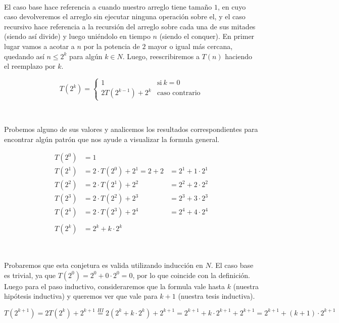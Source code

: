 ~

El caso base hace referencia a cuando nuestro arreglo tiene tama\~no $1$, en cuyo caso devolveremos el arreglo sin ejecutar ninguna operaci\'on sobre el, y el caso recursivo hace referencia a la recursi\'on del arreglo sobre cada una de sus mitades (siendo as\'i divide) y luego uni\'endolo en tiempo $n$ (siendo el conquer). En primer lugar vamos a acotar a $n$ por la potencia de $2$ mayor o igual m\'as cercana, quedando as\'i $n \leq 2^k$ para alg\'un $k \in N$. Luego, reescribiremos a $T(n)$ haciendo el reemplazo por $k$.

\begin{equation*}
  T(2^k) = \begin{cases}
	      1         		& \text{si} \ k = 0 \\
	      2T(2^{k-1}) + 2^k        	& \text{caso contrario}
	  \end{cases}
\end{equation*}

~

Probemos alguno de sus valores y analicemos los resultados correspondientes para encontrar alg\'un patr\'on que nos ayude a visualizar la formula general.

\begin{align*}
 T(2^0) & = 1 \\
 T(2^1) & = 2 \cdot T(2^0) + 2^1 = 2 + 2 & = 2^1 + 1 \cdot 2^1 \\
 T(2^2) & = 2 \cdot T(2^1) + 2^2 & = 2^2 + 2 \cdot 2^2 \\
 T(2^3) & = 2 \cdot T(2^2) + 2^3 &= 2^3 + 3 \cdot 2^3 \\
 T(2^4) & = 2 \cdot T(2^3) + 2^4 &= 2^4 + 4 \cdot 2^4 \\ \\
 T(2^k) & = 2^k + k \cdot 2^k
\end{align*}

~

Probaremos que esta conjetura es valida utilizando inducci\'on en $N$. El caso base es trivial, ya que $T(2^0) = 2^0 + 0 \cdot 2^0 = 0$, por lo que coincide con la definici\'on. Luego para el paso inductivo, consideraremos que la formula vale hasta $k$ (nuestra hip\'otesis inductiva) y queremos ver que vale para $k+1$ (nuestra tesis inductiva).

\begin{equation*}
 T(2^{k+1}) = 2T(2^k) + 2^{k+1} \overset{HI}{=} 2(2^k + k \cdot 2^k) + 2^{k+1} = 2^{k+1} + k \cdot 2^{k+1} + 2^{k+1} = 2^{k+1} + (k+1) \cdot 2^{k+1}
\end{equation*}

